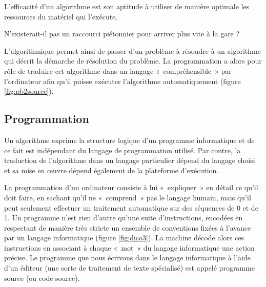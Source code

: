 \begin{defin}
L'efficacité d'un algorithme est son aptitude à utiliser de manière optimale
les ressources du matériel qui l'exécute.
\end{defin}
\noindent N'existerait-il pas un raccourci piétonnier pour arriver plus vite à la gare ?

L'algorithmique permet ainsi de passer d'un problème à résoudre à un algorithme
qui décrit la démarche de résolution du problème. La programmation a alors pour rôle de traduire cet
algorithme dans un langage «~compréhensible~» par l'ordinateur afin qu'il
puisse exécuter l'algorithme automatiquement (figure \ref{fig:pb2source}).


\subsection{Programmation}
Un algorithme exprime la structure logique d'un programme
informatique et de ce fait est indépendant du langage de programmation 
utilisé. Par contre, la traduction de l'algorithme dans un langage particulier
dépend du langage choisi et sa mise en \oe uvre dépend également
de la plateforme d'exécution. 

	
La programmation d'un ordinateur consiste à lui «~expliquer~» en détail 
ce qu'il doit faire, en sachant qu'il ne «~comprend~» pas le langage humain, 
mais qu'il peut seulement effectuer un traitement 
automatique sur des séquences de 0 et de 1.
Un programme n'est rien d'autre qu'une suite d'instructions, encodées en 
respectant de manière très stricte un ensemble de conventions fixées à 
l'avance par un langage informatique (figure \ref{fig:dico3}). 
La machine décode alors
ces instructions en associant à chaque «~mot~»
du langage informatique une action précise.
Le programme que nous écrivons dans le langage informatique
à l'aide d'un éditeur (une sorte de traitement de
texte spécialisé) est appelé programme source (ou code source). 

